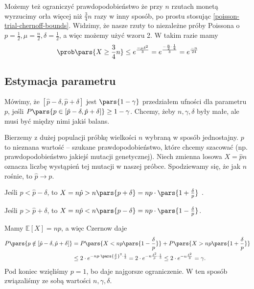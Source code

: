 \begin{example}
	Możemy też ograniczyć prawdopodobieństwo że przy \(n\) rzutach monetą wyrzucimy orła więcej niż \( \frac{3}{4} n \) razy w inny sposób, po prostu stosując \ref{poisson-trial-chernoff-bounds}.
Widzimy, że nasze rzuty to niezależne próby Poissona o \(p = \frac{1}{2}, \mu = \frac{n}{2}, \delta = \frac{1}{2}\), a więc możemy użyć wzoru 2. W takim razie mamy
	\[
		\prob\pars{X \geq \frac{3}{4}n} \leq e^{\frac{-\mu\delta^2}{3}} = e^{\frac{-\frac{n}{2} \cdot \frac{1}{4}}{3}} = e^{\frac{-n}{24}}
	\]
\end{example}

\subsection{Estymacja parametru}

\begin{definition}
	Mówimy, że \([\hat{p}-\delta , \hat{p}+\delta]\) jest \( \pars{ 1-\gamma } \) przedziałem ufności dla parametru \(p\), jeśli \(P \pars{ p \in [\hat{p}-\delta, \hat{p}+\delta] } \ge 1-\gamma\). Chcemy, żeby \(n,\gamma,\delta\) były małe, ale musi być między nimi jakiś balans.
\end{definition}

Bierzemy z dużej populacji próbkę wielkości \(n\) wybraną w sposób jednostajny. \(p\) to nieznana wartość -- szukane prawdopodobieństwo, które chcemy szacować (np. prawdopodobieństwo jakiejś mutacji genetycznej). Niech zmienna losowa \(X = \hat{p}n\) oznacza liczbę wystąpień tej mutacji w naszej próbce. Spodziewamy się, że jak \(n\) rośnie, to \(\hat{p} \to p\).

Jeśli \(p < \hat{p}-\delta\), to \(X = n\hat{p} > n \pars{ p+\delta } = np \cdot \pars{ 1+\frac{\delta}{p} } \) .

Jeśli \(p > \hat{p}+\delta\), to \(X = n \hat{p} < n \pars{ p-\delta } = np \cdot \pars{ 1-\frac{\delta}{p} } \).

Mamy \(\mathbb{E}\left[ X \right] = np\), a więc Czernow daje
\begin{align*}
	P \pars{ p \notin \left[ \hat{p}-\delta, \hat{p}+\delta \right]  } & = P \pars{ X < np \pars{ 1-\frac{\delta}{p} }  } + P \pars{ X > np \pars{ 1+\frac{\delta}{p} }  }                                                          \\
	                                                                         & \le 2\cdot e^{-np \cdot \pars{ \frac{\delta}{p} } ^2 \cdot \frac{1}{3}} = 2\cdot e ^{-n \frac{\delta^2}{p}\cdot \frac{1}{3}} \le 2\cdot e^{-n\frac{\delta^2}{3} } = \gamma .
\end{align*}
Pod koniec wzięliśmy \(p=1\), bo daje najgorsze ograniczenie. W ten sposób związaliśmy ze sobą wartości \(n,\gamma,\delta\).


